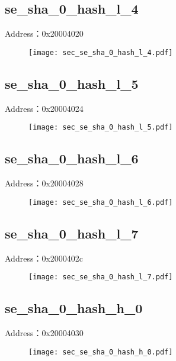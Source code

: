 \subsection{se\_sha\_0\_hash\_l\_4}
\label{sec-se-sha-0-hash-l-4}
Address：0x20004020
 \begin{figure}[H]
\texttt{[image: sec\_se\_sha\_0\_hash\_l\_4.pdf]}
\end{figure}

\subsection{se\_sha\_0\_hash\_l\_5}
\label{sec-se-sha-0-hash-l-5}
Address：0x20004024
 \begin{figure}[H]
\texttt{[image: sec\_se\_sha\_0\_hash\_l\_5.pdf]}
\end{figure}

\subsection{se\_sha\_0\_hash\_l\_6}
\label{sec-se-sha-0-hash-l-6}
Address：0x20004028
 \begin{figure}[H]
\texttt{[image: sec\_se\_sha\_0\_hash\_l\_6.pdf]}
\end{figure}

\subsection{se\_sha\_0\_hash\_l\_7}
\label{sec-se-sha-0-hash-l-7}
Address：0x2000402c
 \begin{figure}[H]
\texttt{[image: sec\_se\_sha\_0\_hash\_l\_7.pdf]}
\end{figure}

\subsection{se\_sha\_0\_hash\_h\_0}
\label{sec-se-sha-0-hash-h-0}
Address：0x20004030
 \begin{figure}[H]
\texttt{[image: sec\_se\_sha\_0\_hash\_h\_0.pdf]}
\end{figure}

